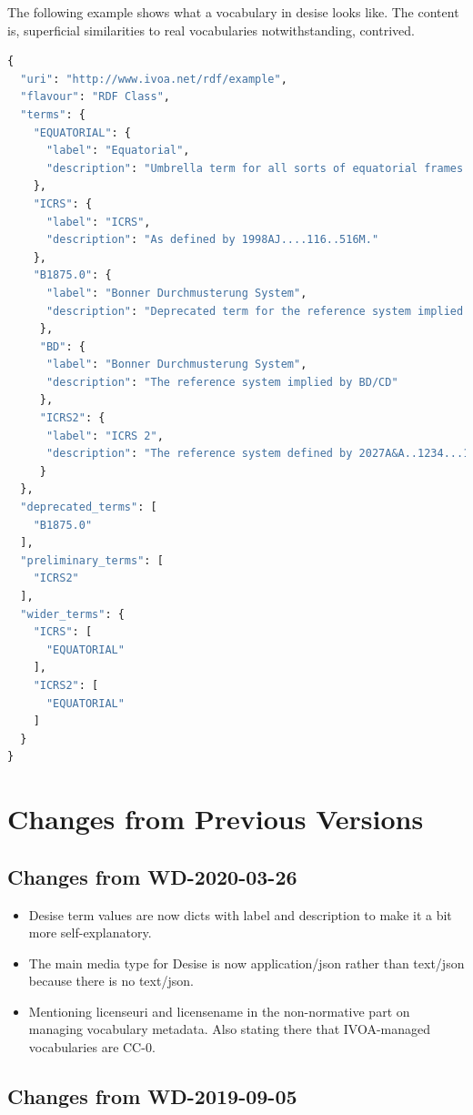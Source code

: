 \documentclass[11pt,a4paper]{ivoa}
\begin{document}
The following example shows what a vocabulary in desise looks like.  The
content is, superficial similarities to real vocabularies
notwithstanding, contrived.

\begin{lstlisting}[language=python]
{
  "uri": "http://www.ivoa.net/rdf/example",
  "flavour": "RDF Class",
  "terms": {
    "EQUATORIAL": {
      "label": "Equatorial",
      "description": "Umbrella term for all sorts of equatorial frames."
    },
    "ICRS": {
      "label": "ICRS",
      "description": "As defined by 1998AJ....116..516M."
    },
    "B1875.0": {
      "label": "Bonner Durchmusterung System",
      "description": "Deprecated term for the reference system implied by BD/CD"
     },
     "BD": {
      "label": "Bonner Durchmusterung System",
      "description": "The reference system implied by BD/CD"
     },
     "ICRS2": {
      "label": "ICRS 2",
      "description": "The reference system defined by 2027A&A..1234...12B"
     }
  },
  "deprecated_terms": [
    "B1875.0"
  ],
  "preliminary_terms": [
    "ICRS2"
  ],
  "wider_terms": {
    "ICRS": [
      "EQUATORIAL"
    ],
    "ICRS2": [
      "EQUATORIAL"
    ]
  }
}
\end{lstlisting}

\section{Changes from Previous Versions}

\subsection{Changes from WD-2020-03-26}

\begin{itemize}
\item Desise term values are now dicts with label and description to
make it a bit more self-explanatory.
\item The main media type for Desise is now application/json rather than
text/json because there is no text/json.
\item Mentioning licenseuri and licensename in the non-normative part on
managing vocabulary metadata. Also stating there that IVOA-managed
vocabularies are CC-0.
\end{itemize}


\subsection{Changes from WD-2019-09-05}
\end{document}
